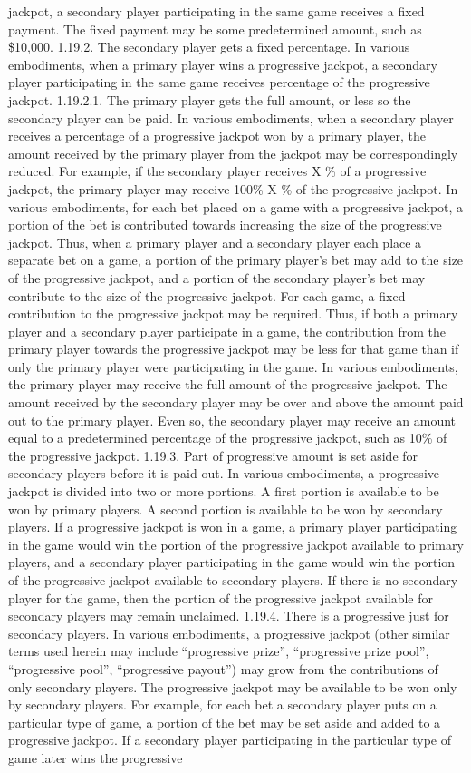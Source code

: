 \documentclass[11pt,a4paper]{article}
\begin{document}
jackpot, a secondary player participating in the same game receives a fixed payment. The fixed payment may be some predetermined amount, such as \$10,000. 1.19.2. The secondary player gets a fixed percentage. In various embodiments, when a primary player wins a progressive jackpot, a secondary player participating in the same game receives percentage of the progressive jackpot. 1.19.2.1. The primary player gets the full amount, or less so the secondary player can be paid. In various embodiments, when a secondary player receives a percentage of a progressive jackpot won by a primary player, the amount received by the primary player from the jackpot may be correspondingly reduced. For example, if the secondary player receives X \% of a progressive jackpot, the primary player may receive 100\%-X \% of the progressive jackpot. In various embodiments, for each bet placed on a game with a progressive jackpot, a portion of the bet is contributed towards increasing the size of the progressive jackpot. Thus, when a primary player and a secondary player each place a separate bet on a game, a portion of the primary player's bet may add to the size of the progressive jackpot, and a portion of the secondary player's bet may contribute to the size of the progressive jackpot. For each game, a fixed contribution to the progressive jackpot may be required. Thus, if both a primary player and a secondary player participate in a game, the contribution from the primary player towards the progressive jackpot may be less for that game than if only the primary player were participating in the game. In various embodiments, the primary player may receive the full amount of the progressive jackpot. The amount received by the secondary player may be over and above the amount paid out to the primary player. Even so, the secondary player may receive an amount equal to a predetermined percentage of the progressive jackpot, such as 10\% of the progressive jackpot. 1.19.3. Part of progressive amount is set aside for secondary players before it is paid out. In various embodiments, a progressive jackpot is divided into two or more portions. A first portion is available to be won by primary players. A second portion is available to be won by secondary players. If a progressive jackpot is won in a game, a primary player participating in the game would win the portion of the progressive jackpot available to primary players, and a secondary player participating in the game would win the portion of the progressive jackpot available to secondary players. If there is no secondary player for the game, then the portion of the progressive jackpot available for secondary players may remain unclaimed. 1.19.4. There is a progressive just for secondary players. In various embodiments, a progressive jackpot (other similar terms used herein may include “progressive prize”, “progressive prize pool”, “progressive pool”, “progressive payout”) may grow from the contributions of only secondary players. The progressive jackpot may be available to be won only by secondary players. For example, for each bet a secondary player puts on a particular type of game, a portion of the bet may be set aside and added to a progressive jackpot. If a secondary player participating in the particular type of game later wins the progressive 
\end{document}
